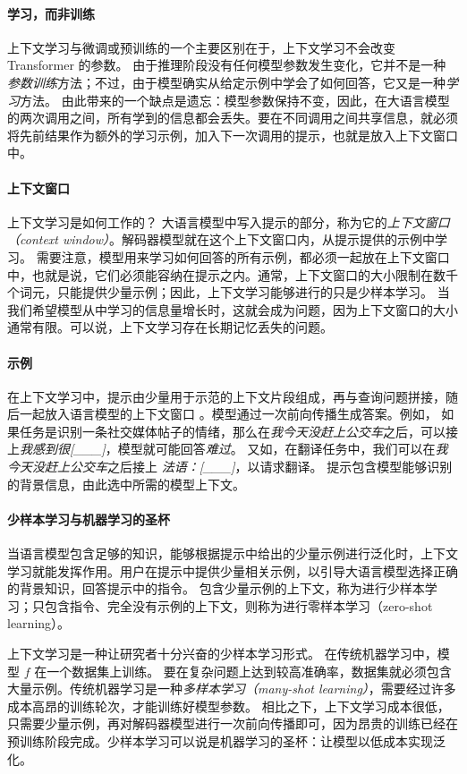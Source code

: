 \paragraph{学习，而非训练}
上下文学习与微调或预训练的一个主要区别在于，上下文学习不会改变 Transformer 的参数。
由于推理阶段没有任何模型参数发生变化，它并不是一种{\em 参数训练}方法；不过，由于模型确实从给定示例中学会了如何回答，它又是一种{\em 学习}方法。
由此带来的一个缺点是遗忘：模型参数保持不变，因此，在大语言模型的两次调用之间，所有学到的信息都会丢失。要在不同调用之间共享信息，就必须将先前结果作为额外的学习示例，加入下一次调用的提示，也就是放入上下文窗口中。

\paragraph{上下文窗口}
上下文学习是如何工作的？
大语言模型中写入提示的部分，称为它的{\em 上下文窗口（context window）}。解码器模型就在这个上下文窗口内，从提示提供的示例中学习。
需要注意，模型用来学习如何回答的所有示例，都必须一起放在上下文窗口中，也就是说，它们必须能容纳在提示之内。通常，上下文窗口的大小限制在数千个词元，只能提供少量示例；因此，上下文学习能够进行的只是少样本学习。
当我们希望模型从中学习的信息量增长时，这就会成为问题，因为上下文窗口的大小通常有限。可以说，上下文学习存在长期记忆丢失的问题。

\paragraph{示例}
在上下文学习中，提示由少量用于示范的上下文片段组成，再与查询问题拼接，随后一起放入语言模型的上下文窗口 \citep{liu2023pre}。模型通过一次前向传播生成答案。例如，
如果任务是识别一条社交媒体帖子的情绪，那么在{\em 我今天没赶上公交车}之后，可以接上{\em 我感到很[\_\_\_]}，模型就可能回答{\em 难过}。
又如，在翻译任务中，我们可以在{\em 我今天没赶上公交车}之后接上
{\em 法语：[\_\_\_]}，以请求翻译。
提示包含模型能够识别的背景信息，由此选中所需的模型上下文。

\paragraph{少样本学习与机器学习的圣杯}
当语言模型包含足够的知识，能够根据提示中给出的少量示例进行泛化时，上下文学习就能发挥作用。用户在提示中提供少量相关示例，以引导大语言模型选择正确的背景知识，回答提示中的指令。
包含少量示例的上下文，称为进行少样本学习；只包含指令、完全没有示例的上下文，则称为进行零样本学习（zero-shot learning）。

上下文学习是一种让研究者十分兴奋的少样本学习形式。
在传统机器学习中，模型 $f$ 在一个数据集上训练。
要在复杂问题上达到较高准确率，数据集就必须包含大量示例。传统机器学习是一种{\em 多样本学习（many-shot learning）}，需要经过许多成本高昂的训练轮次，才能训练好模型参数。
相比之下，上下文学习成本很低，只需要少量示例，再对解码器模型进行一次前向传播即可，因为昂贵的训练已经在预训练阶段完成。少样本学习可以说是机器学习的圣杯：让模型以低成本实现泛化。

